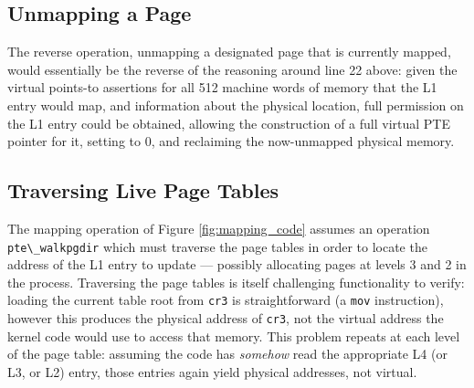 \subsection{Unmapping a Page}
The reverse operation, unmapping a designated page that is currently mapped,
would essentially be the reverse of
the reasoning around line 22 above: given the virtual points-to assertions for all 512
machine words of memory that the L1 entry would map,
and information about the physical location, 
full permission on the L1 entry could be obtained, allowing the construction of a
full virtual PTE pointer for it, setting to 0, and reclaiming the now-unmapped physical memory.

\subsection{Traversing Live Page Tables}
\label{sec:traversing}
The mapping operation of Figure \ref{fig:mapping_code} assumes an operation \lstinline|pte\_walkpgdir| which must traverse the page tables
in order to locate the address of the L1 entry to update --- possibly allocating pages at levels 3 and 2 in the process.
Traversing the page tables is itself challenging functionality to verify: loading the current table root from \lstinline|cr3| is straightforward
(a \lstinline|mov| instruction), however this produces the physical address of \lstinline|cr3|, not the virtual address the kernel code would use to access that memory.
This problem repeats at each level of the page table: assuming the code has \emph{somehow} read the appropriate L4 (or L3, or L2) entry, those entries again
yield physical addresses, not virtual.

